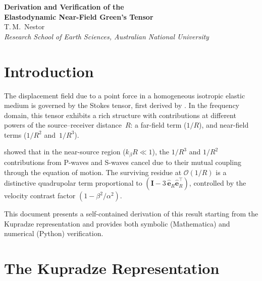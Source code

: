 \documentclass[11pt,a4paper]{article}
\newcommand{\bI}{\mathbf{I}}
\newcommand{\beR}{\hat{\mathbf{e}}_R}
\newcommand{\order}[1]{\mathcal{O}\!\left(#1\right)}
\begin{document}
\thispagestyle{plain}
\begin{center}
\vspace*{1em}
{\LARGE\bfseries Derivation and Verification of the\\[0.3em]
Elastodynamic Near-Field Green's Tensor}\\[1.8em]
{\large T.\,M.\ Nestor}\\[0.5em]
{\itshape Research School of Earth Sciences, Australian National University}\\[2em]
\end{center}

\section{Introduction}

The displacement field due to a point force in a homogeneous isotropic
elastic medium is governed by the Stokes tensor, first derived by
\citet{Stokes1849}. In the frequency domain, this tensor exhibits a
rich structure with contributions at different powers of the
source--receiver distance~$R$: a far-field term ($1/R$), and
near-field terms ($1/R^2$ and~$1/R^3$).

\citet{WuBenMenahem1985} showed that in the near-source region
($k_\beta R \ll 1$), the $1/R^3$ and $1/R^2$ contributions from
P-waves and S-waves cancel due to their mutual coupling through the
equation of motion. The surviving residue at $\order{1/R}$ is a
distinctive quadrupolar term proportional to
$(\bI - 3\,\beR\beR^{\!\top})$, controlled by the velocity contrast
factor $(1 - \beta^2/\alpha^2)$.

This document presents a self-contained derivation of this result
starting from the Kupradze representation
\citep{Kupradze1963,Kausel2006} and provides both symbolic
(Mathematica) and numerical (Python) verification.

\section{The Kupradze Representation}
\end{document}
